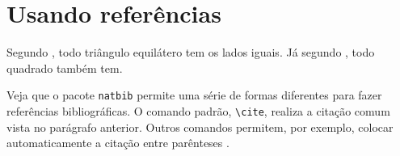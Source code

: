 \documentclass[
	portugues %
]{./ppgccufmg}
\begin{document}

		\section{Usando referências}
			Segundo \cite{horn86robot}, todo triângulo equilátero tem os lados iguais. Já segundo \cite{shashua97photometric}, todo quadrado também tem.
			
			Veja que o pacote \verb|natbib| permite uma série de formas diferentes para fazer referências bibliográficas. O comando padrão, \verb|\cite|, realiza a citação comum vista no parágrafo anterior. Outros comandos permitem, por exemplo, colocar automaticamente a citação entre	parênteses \citep{hougen93estimation, sato99illumination2, sato99illumination1, sato01stability}.
			
\end{document}
